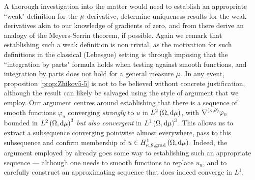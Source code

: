 A thorough investigation into the matter would need to establish an appropriate ``weak" definition for the $\mu$-derivative, determine uniqueness results for the weak derivatives akin to our knowledge of gradients of zero, and from there derive an analogy of the Meyers-Serrin theorem, if possible.
Again we remark that establishing such a weak definition is non trivial, as the motivation for such definitions in the classical (Lebesgue) setting is through imposing that the ``integration by parts" formula holds when testing against smooth functions, and integration by parts does not hold for a general measure $\mu$. 
In any event, proposition \ref{prop:Zhikov5-5} is not to be believed without concrete justification, although the result \cite[lemma 6.1]{zhikov2002homogenization} can likely be salvaged using the style of argument that we employ.
Our argument centres around establishing that there is a sequence of smooth functions $\varphi_n$ converging \emph{strongly} to $u$ in $L^{2}\left( \Omega,\mathrm{d} \mu \right)$, with $\nabla^{\left( \kappa, \theta \right)}\varphi_n$ bounded in $L^{2}\left( \Omega,\mathrm{d} \mu \right)^3$ \emph{but also convergent} in $L^1\left( \Omega,\mathrm{d}\mu \right)^3$.
This allows us to extract a subsequence converging pointwise almost everywhere, pass to this subsequence and confirm membership of $u\in H^1_{\kappa,\theta,\mathrm{grad}}\left( \Omega, \mathrm{d}\mu \right)$.
Indeed, the argument employed by \cite[lemma 6.1]{zhikov2002homogenization} already goes some way to establishing such an appropriate sequence --- although one needs to smooth functions to replace $u_n$, and to carefully construct an approximating sequence that does indeed converge in $L^1$.

